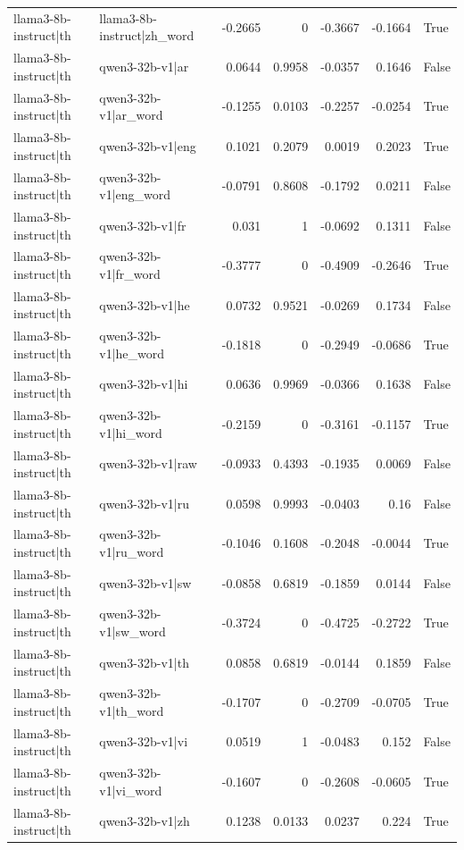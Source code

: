 \begin{table}
\begin{tabular}{l l r r r r l}
llama3-8b-instruct|th & llama3-8b-instruct|zh_word & -0.2665 & 0 & -0.3667 & -0.1664 & True \\
llama3-8b-instruct|th & qwen3-32b-v1|ar & 0.0644 & 0.9958 & -0.0357 & 0.1646 & False \\
llama3-8b-instruct|th & qwen3-32b-v1|ar_word & -0.1255 & 0.0103 & -0.2257 & -0.0254 & True \\
llama3-8b-instruct|th & qwen3-32b-v1|eng & 0.1021 & 0.2079 & 0.0019 & 0.2023 & True \\
llama3-8b-instruct|th & qwen3-32b-v1|eng_word & -0.0791 & 0.8608 & -0.1792 & 0.0211 & False \\
llama3-8b-instruct|th & qwen3-32b-v1|fr & 0.031 & 1 & -0.0692 & 0.1311 & False \\
llama3-8b-instruct|th & qwen3-32b-v1|fr_word & -0.3777 & 0 & -0.4909 & -0.2646 & True \\
llama3-8b-instruct|th & qwen3-32b-v1|he & 0.0732 & 0.9521 & -0.0269 & 0.1734 & False \\
llama3-8b-instruct|th & qwen3-32b-v1|he_word & -0.1818 & 0 & -0.2949 & -0.0686 & True \\
llama3-8b-instruct|th & qwen3-32b-v1|hi & 0.0636 & 0.9969 & -0.0366 & 0.1638 & False \\
llama3-8b-instruct|th & qwen3-32b-v1|hi_word & -0.2159 & 0 & -0.3161 & -0.1157 & True \\
llama3-8b-instruct|th & qwen3-32b-v1|raw & -0.0933 & 0.4393 & -0.1935 & 0.0069 & False \\
llama3-8b-instruct|th & qwen3-32b-v1|ru & 0.0598 & 0.9993 & -0.0403 & 0.16 & False \\
llama3-8b-instruct|th & qwen3-32b-v1|ru_word & -0.1046 & 0.1608 & -0.2048 & -0.0044 & True \\
llama3-8b-instruct|th & qwen3-32b-v1|sw & -0.0858 & 0.6819 & -0.1859 & 0.0144 & False \\
llama3-8b-instruct|th & qwen3-32b-v1|sw_word & -0.3724 & 0 & -0.4725 & -0.2722 & True \\
llama3-8b-instruct|th & qwen3-32b-v1|th & 0.0858 & 0.6819 & -0.0144 & 0.1859 & False \\
llama3-8b-instruct|th & qwen3-32b-v1|th_word & -0.1707 & 0 & -0.2709 & -0.0705 & True \\
llama3-8b-instruct|th & qwen3-32b-v1|vi & 0.0519 & 1 & -0.0483 & 0.152 & False \\
llama3-8b-instruct|th & qwen3-32b-v1|vi_word & -0.1607 & 0 & -0.2608 & -0.0605 & True \\
llama3-8b-instruct|th & qwen3-32b-v1|zh & 0.1238 & 0.0133 & 0.0237 & 0.224 & True \\

\end{tabular}
\end{table}
